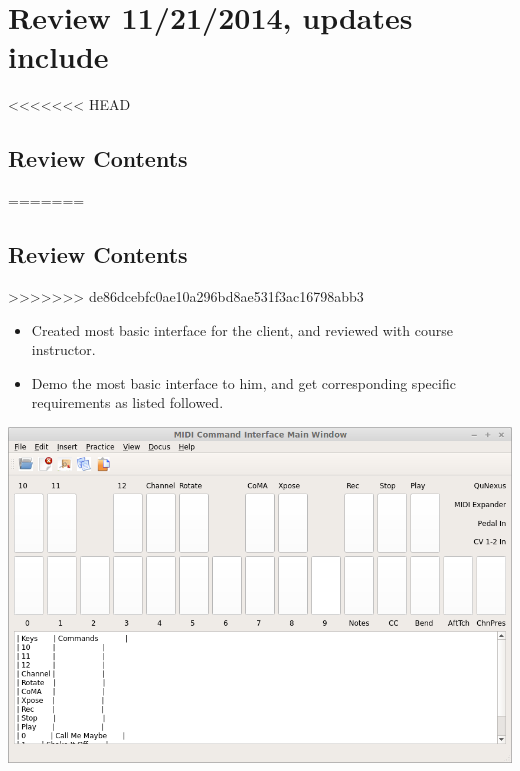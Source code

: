 \documentclass[9pt,b5paper]{article}
\begin{document}
\section{Review 11/21/2014, updates include}
<<<<<<< HEAD
\label{sec-11}
\subsection{Review Contents}
\label{sec-11-1}
=======
\label{sec-10}
\subsection{Review Contents}
\label{sec-10-1}
>>>>>>> de86dcebfc0ae10a296bd8ae531f3ac16798abb3
\begin{itemize}
\item Created most basic interface for the client, and reviewed with course instructor.
\item Demo the most basic interface to him, and get corresponding specific requirements as listed followed.
\end{itemize}

\includegraphics[width=.9\linewidth]{./pic/2014-11-20_21:52:19.png}
\end{document}
